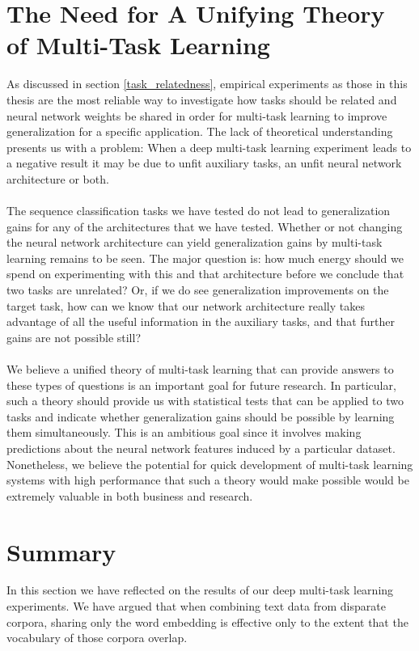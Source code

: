 \section{The Need for A Unifying Theory of Multi-Task Learning}
As discussed in section \ref{task_relatedness}, empirical experiments as those in this thesis are the most reliable way to investigate how tasks should be related and neural network weights be shared in order for multi-task learning to improve generalization for a specific application. The lack of theoretical understanding presents us with a problem: When a deep multi-task learning experiment leads to a negative result it may be due to unfit auxiliary tasks, an unfit neural network architecture or both.
\\\\
The sequence classification tasks we have tested do not lead to generalization gains for any of the architectures that we have tested. Whether or not changing the neural network architecture can yield generalization gains by multi-task learning remains to be seen. The major question is: how much energy should we spend on experimenting with this and that architecture before we conclude that two tasks are unrelated? Or, if we do see generalization improvements on the target task, how can we know that our network architecture really takes advantage of all the useful information in the auxiliary tasks, and that further gains are not possible still?
\\\\
We believe a unified theory of multi-task learning that can provide answers to these types of questions is an important goal for future research. In particular, such a theory should provide us with statistical tests that can be applied to two tasks and indicate whether generalization gains should be possible by learning them simultaneously. This is an ambitious goal since it involves making predictions about the neural network features induced by a particular dataset. Nonetheless, we believe the potential for quick development of multi-task learning systems with high performance that such a theory would make possible would be extremely valuable in both business and research.

\section{Summary}
In this section we have reflected on the results of our deep multi-task learning experiments. We have argued that when combining text data from disparate corpora, sharing only the word embedding is effective only to the extent that the vocabulary of those corpora overlap. 

